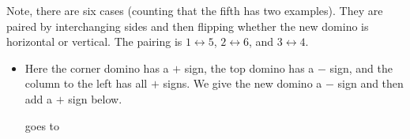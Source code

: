 \documentclass[12pt]{article}
\numberwithin{equation}{section}
\newcommand{\horizontalDominoRSShift}[4]{\filldraw [dominoRSStyle] (#2 - 1 + #4 + \eps, #1 - 1 + \eps) rectangle + (2 - \teps, 1 -\teps) node [dominoText] {$#3$};}
\newcommand{\verticalDominoRSShift}[4]{\filldraw [dominoRSStyle] (#2 - 1 + #4 + \eps,  #1 - 1 + \eps) rectangle + (1 - \teps,2 -\teps) node [dominoText] {$#3$};}
\begin{document}
\begin{itemize}
    Note, there are six cases (counting that the fifth has two examples).
    They are paired by interchanging sides and then flipping whether the new domino is horizontal or vertical.
    The pairing is $1 \leftrightarrow 5$, $2 \leftrightarrow 6$, and $3 \leftrightarrow 4$.
    \begin{itemize}
      \item Here the corner domino has a $+$ sign, the top domino has a $-$ sign, and the column to the left has all $+$ signs.
      We give the new domino a $-$ sign and then add a $+$ sign below.
      \begin{figure}[H]
        \centering
      \end{figure}
      goes to
      \begin{figure}[H]
        \centering
\end{figure}
\end{itemize}
\end{itemize}
\end{document}
